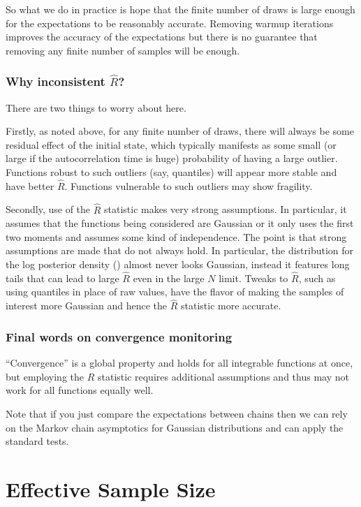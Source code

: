 So what we do in practice is hope that the finite number of draws is
large enough for the expectations to be reasonably accurate. Removing
warmup iterations improves the accuracy of the expectations but there
is no guarantee that removing any finite number of samples will be
enough.

\subsubsection{Why inconsistent $\hat{R}$?}

There are two things to worry about here.

Firstly, as noted above, for any finite number of draws, there will
always be some residual effect of the initial state, which typically
manifests as some small (or large if the autocorrelation time is huge)
probability of having a large outlier. Functions robust to such
outliers (say, quantiles) will appear more stable and have better
$\hat{R}$. Functions vulnerable to such outliers may show fragility.

Secondly, use of the $\hat{R}$ statistic makes very strong
assumptions. In particular, it assumes that the functions being
considered are Gaussian or it only uses the first two moments and
assumes some kind of independence.  The point is that strong
assumptions are made that do not always hold. In particular, the
distribution for the log posterior density () almost
never looks Gaussian, instead it features long tails that can lead to
large $\hat{R}$ even in the large $N$ limit.  Tweaks to $\hat{R}$,
such as using quantiles in place of raw values, have the flavor of
making the samples of interest more Gaussian and hence the $\hat{R}$
statistic more accurate.

\subsubsection{Final words on convergence monitoring}

``Convergence'' is a global property and holds for all integrable
functions at once, but employing the $\hat{R}$ statistic requires
additional assumptions and thus may not work for all functions equally
well.

Note that if you just compare the expectations between chains then we
can rely on the Markov chain asymptotics for Gaussian distributions
and can apply the standard tests.



\section{Effective Sample Size}\label{effective-sample-size.section}

